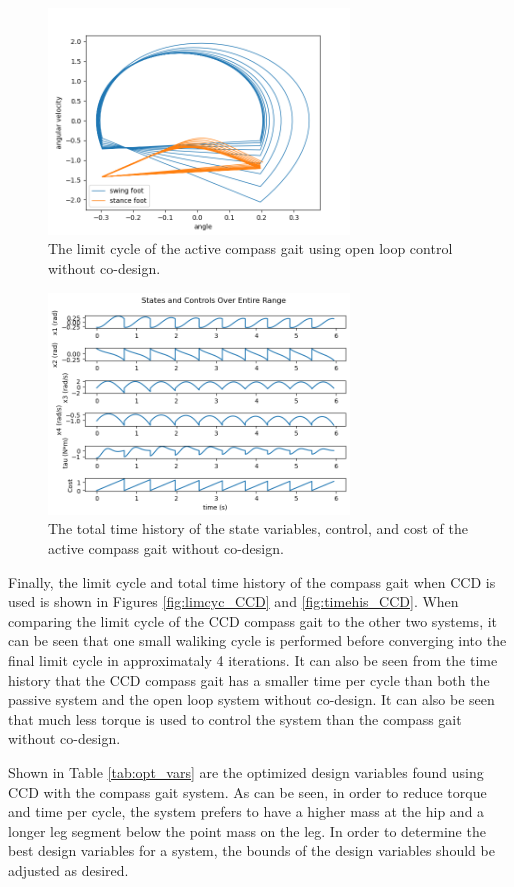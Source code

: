 \documentclass[smallextended]{./springer/svjour3}
\begin{document}
\begin{figure}[h]
\centering
\includegraphics[width=8cm]{./figures/limcycle_nocodesign.png}
\caption{The limit cycle of the active compass gait using open loop control without co-design.}
\label{fig:lim_noco}
\end{figure}

\begin{figure}[h]
\centering
\includegraphics[width=8cm]{./figures/timehis_nocodesign.png}
\caption{The total time history of the state variables, control, and cost of the active compass gait without co-design.}
\label{fig:timehis_noco}
\end{figure}

Finally, the limit cycle and total time history of the compass gait when CCD is used is shown in Figures \ref{fig:limcyc_CCD} and \ref{fig:timehis_CCD}. When comparing the limit 
cycle of the CCD compass gait to the other two systems, it can be seen that one small waliking cycle is performed before converging into the final limit cycle in approximataly 4 
iterations. It can also be seen from the time history that the CCD compass gait has a smaller time per cycle than both the passive system and the open loop system without co-design. 
It can also be seen that much less torque is used to control the system than the compass gait without co-design.

Shown in Table \ref{tab:opt_vars} are the optimized design variables found using CCD with the compass gait system. As can be seen, in order to reduce torque and time per cycle, 
the system prefers to have a higher mass at the hip and a longer leg segment below the point mass on the leg. In order to determine the best design variables for a system, 
the bounds of the design variables should be adjusted as desired.
\end{document}
